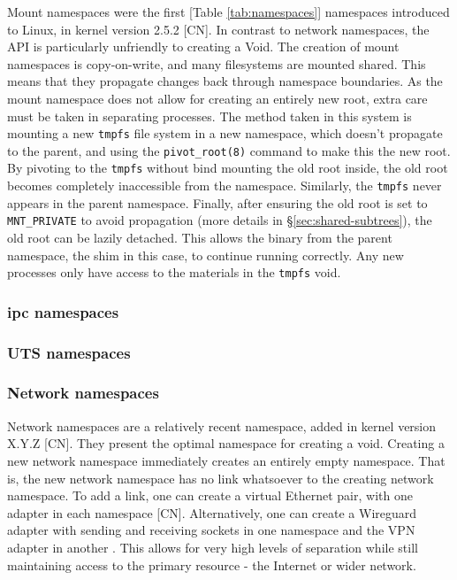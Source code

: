 \documentclass[sigplan]{acmart}
\begin{document}
Mount namespaces were the first [Table \ref{tab:namespaces}] namespaces introduced to Linux, in kernel version 2.5.2 [CN]. In contrast to network namespaces, the API is particularly unfriendly to creating a Void. The creation of mount namespaces is copy-on-write, and many filesystems are mounted shared. This means that they propagate changes back through namespace boundaries. As the mount namespace does not allow for creating an entirely new root, extra care must be taken in separating processes. The method taken in this system is mounting a new \texttt{tmpfs} file system in a new namespace, which doesn't propagate to the parent, and using the \texttt{pivot\_root(8)} command to make this the new root. By pivoting to the \texttt{tmpfs} without bind mounting the old root inside, the old root becomes completely inaccessible from the namespace. Similarly, the \texttt{tmpfs} never appears in the parent namespace. Finally, after ensuring the old root is set to \texttt{MNT\_PRIVATE} to avoid propagation (more details in §\ref{sec:shared-subtrees}), the old root can be lazily detached. This allows the binary from the parent namespace, the shim in this case, to continue running correctly. Any new processes only have access to the materials in the \texttt{tmpfs} void.

\subsubsection{ipc namespaces}


\subsubsection{UTS namespaces}


\subsubsection{Network namespaces}

Network namespaces are a relatively recent namespace, added in kernel version X.Y.Z [CN]. They present the optimal namespace for creating a void. Creating a new network namespace immediately creates an entirely empty namespace. That is, the new network namespace has no link whatsoever to the creating network namespace. To add a link, one can create a virtual Ethernet pair, with one adapter in each namespace [CN]. Alternatively, one can create a Wireguard adapter with sending and receiving sockets in one namespace and the VPN adapter in another \citep[§7.3]{donenfeld_wireguard_2017}. This allows for very high levels of separation while still maintaining access to the primary resource - the Internet or wider network.
\end{document}
